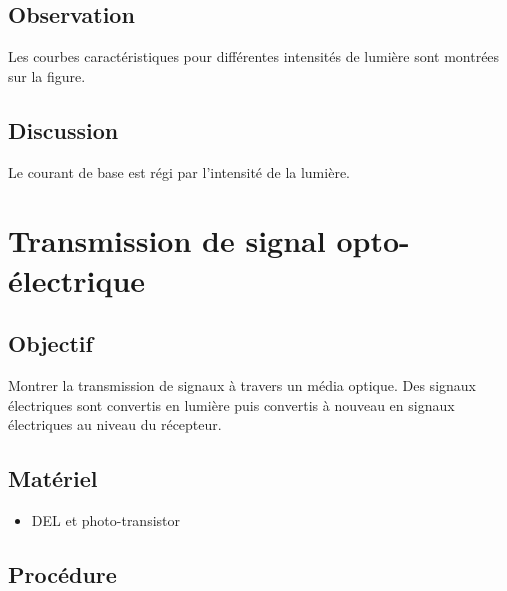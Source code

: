 \documentclass{book}
\begin{document}
\subsection{Observation}


Les courbes caractéristiques pour différentes intensités de lumière sont montrées sur la figure.

\subsection{Discussion}


Le courant de base est régi par l'intensité de la lumière.







\section{Transmission de signal opto-électrique}



\subsection{Objectif}


Montrer la transmission de signaux à travers un média optique. Des signaux électriques sont convertis en lumière puis convertis à nouveau en signaux électriques au niveau du récepteur.




\subsection{Matériel}


\begin{itemize}
  \item DEL et photo-transistor
\end{itemize}

\subsection{Procédure}
\end{document}
